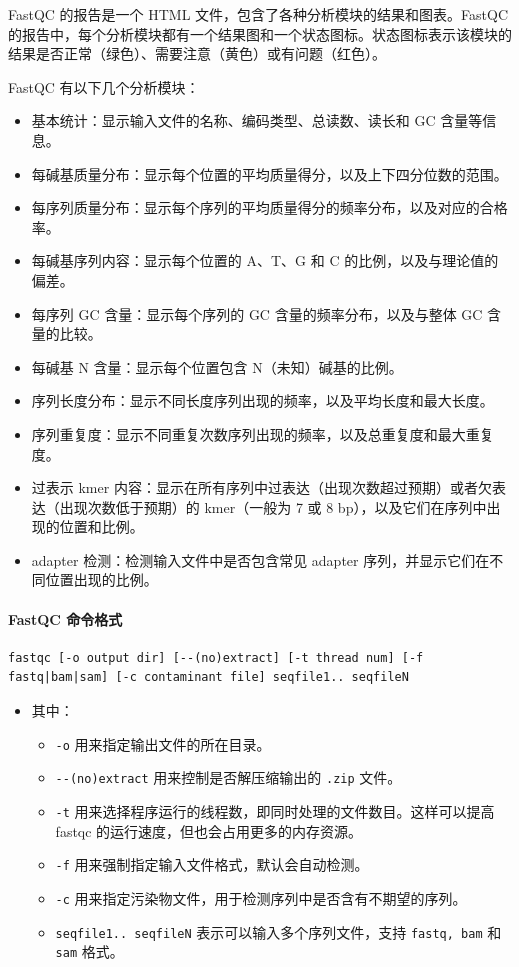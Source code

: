 \documentclass[UTF8]{ctexart}
\begin{document}
FastQC 的报告是一个 HTML 文件，包含了各种分析模块的结果和图表。FastQC 的报告中，每个分析模块都有一个结果图和一个状态图标。状态图标表示该模块的结果是否正常（绿色）、需要注意（黄色）或有问题（红色）。

FastQC 有以下几个分析模块：

\begin{itemize}
	\item 基本统计：显示输入文件的名称、编码类型、总读数、读长和 GC 含量等信息。
	\item 每碱基质量分布：显示每个位置的平均质量得分，以及上下四分位数的范围。
	\item 每序列质量分布：显示每个序列的平均质量得分的频率分布，以及对应的合格率。
	\item 每碱基序列内容：显示每个位置的 A、T、G 和 C 的比例，以及与理论值的偏差。
	\item 每序列 GC 含量：显示每个序列的 GC 含量的频率分布，以及与整体 GC 含量的比较。
	\item 每碱基 N 含量：显示每个位置包含 N（未知）碱基的比例。
	\item 序列长度分布：显示不同长度序列出现的频率，以及平均长度和最大长度。
	\item 序列重复度：显示不同重复次数序列出现的频率，以及总重复度和最大重复度。
	\item 过表示 kmer 内容：显示在所有序列中过表达（出现次数超过预期）或者欠表达（出现次数低于预期）的 kmer（一般为 7 或 8 bp），以及它们在序列中出现的位置和比例。
	\item adapter 检测：检测输入文件中是否包含常见 adapter 序列，并显示它们在不同位置出现的比例。
	
\end{itemize}

\paragraph*{FastQC 命令格式}

\begin{lstlisting}
fastqc [-o output dir] [--(no)extract] [-t thread num] [-f fastq|bam|sam] [-c contaminant file] seqfile1.. seqfileN
\end{lstlisting}

\begin{itemize}
	\item 其中：
	\begin{itemize}
		\item \verb|-o| 用来指定输出文件的所在目录。
		\item \verb|--(no)extract| 用来控制是否解压缩输出的 \verb|.zip| 文件。
		\item \verb|-t| 用来选择程序运行的线程数，即同时处理的文件数目。这样可以提高 fastqc 的运行速度，但也会占用更多的内存资源。
		\item \verb|-f| 用来强制指定输入文件格式，默认会自动检测。
		\item \verb|-c| 用来指定污染物文件，用于检测序列中是否含有不期望的序列。
		\item \verb|seqfile1.. seqfileN| 表示可以输入多个序列文件，支持 \verb|fastq, bam| 和 \verb|sam| 格式。
	\end{itemize}
\end{itemize}
\end{document}
